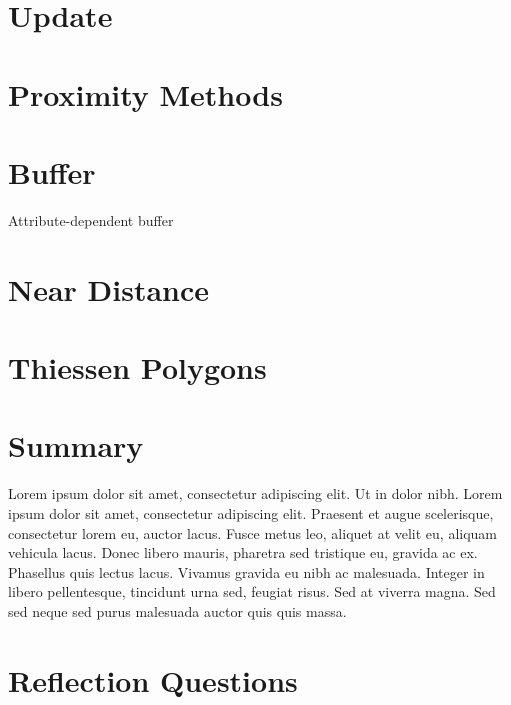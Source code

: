 \documentclass[
]{book}
\begin{document}
\hypertarget{update}{%
\section{Update}\label{update}}

\hypertarget{proximity-methods}{%
\section{Proximity Methods}\label{proximity-methods}}

\hypertarget{buffer}{%
\section{Buffer}\label{buffer}}

Attribute-dependent buffer

\hypertarget{near-distance}{%
\section{Near Distance}\label{near-distance}}

\hypertarget{thiessen-polygons}{%
\section{Thiessen Polygons}\label{thiessen-polygons}}

\hypertarget{summary-5}{%
\section{Summary}\label{summary-5}}

Lorem ipsum dolor sit amet, consectetur adipiscing elit. Ut in dolor nibh. Lorem ipsum dolor sit amet, consectetur adipiscing elit. Praesent et augue scelerisque, consectetur lorem eu, auctor lacus. Fusce metus leo, aliquet at velit eu, aliquam vehicula lacus. Donec libero mauris, pharetra sed tristique eu, gravida ac ex. Phasellus quis lectus lacus. Vivamus gravida eu nibh ac malesuada. Integer in libero pellentesque, tincidunt urna sed, feugiat risus. Sed at viverra magna. Sed sed neque sed purus malesuada auctor quis quis massa.

\hypertarget{reflection-questions-4}{%
\section*{Reflection Questions}\label{reflection-questions-4}}
\end{document}
